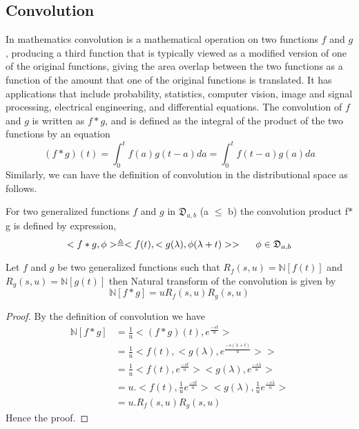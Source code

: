  \subsection{Convolution}
 In mathematics convolution is a mathematical operation on two functions $f$ and $g$, producing a third function that is typically viewed as a modified version of one of the original functions, giving the area overlap between the two functions as a function of the amount that one of the original functions is translated. It has applications that include probability, statistics, computer vision, image and signal processing, electrical engineering, and differential equations.
The convolution of $f$ and $g$ is written as $f \ast g  $, and is defined as the integral of the product of the two functions by an equation
\begin{equation*}
(f \ast g )(t)=\int_{0}^{t}f(a)g(t-a)da=\int_{0}^{t}f(t-a)g(a)da
\end{equation*}
Similarly, we can have the definition of convolution in the distributional space as follows.
 \begin{definition}
 For two generalized functions $f$ and $g$ in $\mathfrak{D}_{a,b}$ (a $\leq$ b) the convolution product f$\ast$g is defined by expression,
 \begin{equation}
 <f\ast g,\phi>\triangleq <f(t),<g(\lambda),\phi(\lambda+t)>> \hspace{0.5cm}\phi \in \mathfrak{D}_{a,b}
 \end{equation}
 \end{definition}

\begin{theorem}
 Let $f$ and $g$ be two generalized functions such that $R_{f}(s,u)=\mathbb{N}[f(t)]$ and $R_{g}(s,u)=\mathbb{N}[g(t)]$ then Natural transform of the convolution is given by
 \begin{equation}
 \mathbb{N}[f\ast g] = u R_{f}(s,u)R_{g}(s,u)
 \end{equation}
\end{theorem}
\begin{proof}
 By the definition of convolution we have
\begin{align*}
\mathbb{N}[f\ast g]&=\frac{1}{u}<(f\ast g)(t),e^{\frac{-st}{u}}>\\
&=\frac{1}{u}<f(t),<g(\lambda),e^{\frac{-s(\lambda+t)}{u}}>>\\
&=\frac{1}{u}<f(t),e^{\frac{-st}{u}}><g(\lambda),e^{\frac{-s\lambda}{u}}>\\
&=u.<f(t),\frac{1}{u}e^{\frac{-st}{u}}><g(\lambda),\frac{1}{u}e^{\frac{-s\lambda}{u}}>\\
&=u.R_{f}(s,u)R_{g}(s,u)
\end{align*}
 Hence the proof.
 \end{proof}
